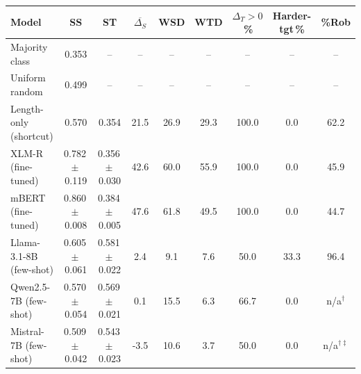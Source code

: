 \begin{tabular}{lcccccccc}
\toprule
Model & SS & ST & $\overline{\Delta_S}$ & WSD & WTD & $\Delta_T{>}0$\,\% & Harder-tgt\,\% & \%Rob \\
\midrule
Majority class & 0.353 & -- & -- & -- & -- & -- & -- & -- \\
Uniform random & 0.499 & -- & -- & -- & -- & -- & -- & -- \\
Length-only (shortcut) & 0.570 & 0.354 & 21.5 & 26.9 & 29.3 & 100.0 & 0.0 & 62.2 \\
\midrule
XLM-R (fine-tuned) & 0.782\,$\pm$\,0.119 & 0.356\,$\pm$\,0.030 & 42.6 & 60.0 & 55.9 & 100.0 & 0.0 & 45.9 \\
mBERT (fine-tuned) & 0.860\,$\pm$\,0.008 & 0.384\,$\pm$\,0.005 & 47.6 & 61.8 & 49.5 & 100.0 & 0.0 & 44.7 \\
\midrule
Llama-3.1-8B (few-shot) & 0.605\,$\pm$\,0.061 & 0.581\,$\pm$\,0.022 & 2.4 & 9.1 & 7.6 & 50.0 & 33.3 & 96.4 \\
Qwen2.5-7B (few-shot) & 0.570\,$\pm$\,0.054 & 0.569\,$\pm$\,0.021 & 0.1 & 15.5 & 6.3 & 66.7 & 0.0 & n/a$^\dagger$ \\
Mistral-7B (few-shot) & 0.509\,$\pm$\,0.042 & 0.543\,$\pm$\,0.023 & -3.5 & 10.6 & 3.7 & 50.0 & 0.0 & n/a$^{\dagger\ddagger}$ \\
\bottomrule
\end{tabular}
